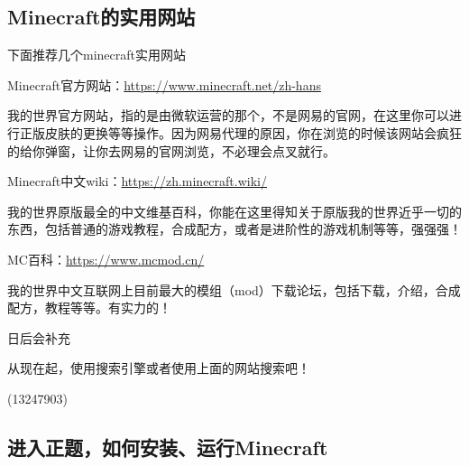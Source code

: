 \documentclass[UTF8,a4paper]{article}
\begin{document}
		\subsection{Minecraft的实用网站}
			\par 下面推荐几个minecraft实用网站
			\par Minecraft官方网站：\href{https://www.minecraft.net/zh-hans}{https://www.minecraft.net/zh-hans}
			\par 我的世界官方网站，指的是由微软运营的那个，不是网易的官网，在这里你可以进行正版皮肤的更换等等操作。因为网易代理的原因，你在浏览的时候该网站会疯狂的给你弹窗，让你去网易的官网浏览，不必理会点叉就行。
			\par Minecraft中文wiki：\href{https://zh.minecraft.wiki/}{https://zh.minecraft.wiki/}
			\par 我的世界原版最全的中文维基百科，你能在这里得知关于原版我的世界近乎一切的东西，包括普通的游戏教程，合成配方，或者是进阶性的游戏机制等等，强强强！
			\par MC百科：\href{https://www.mcmod.cn/}{https://www.mcmod.cn/}
			\par 我的世界中文互联网上目前最大的模组（mod）下载论坛，包括下载，介绍，合成配方，教程等等。有实力的！
			\par 日后会补充
			\par 从现在起，使用搜索引擎或者使用上面的网站搜索吧！
			\begin{flushright}(13247903)\end{flushright}
		\subsection{进入正题，如何安装、运行Minecraft}
\end{document}

